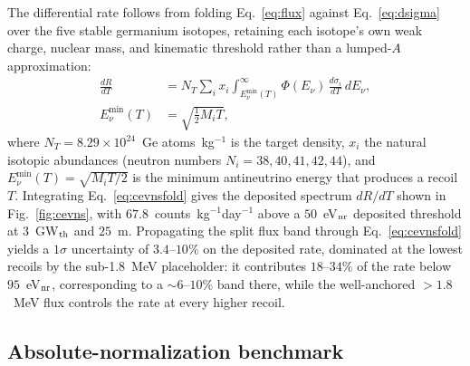 The differential rate follows from folding Eq.~\eqref{eq:flux} against Eq.~\eqref{eq:dsigma} over the five stable germanium isotopes, retaining each isotope's own weak charge, nuclear mass, and kinematic threshold rather than a lumped-$A$ approximation:
\begin{equation}
\begin{aligned}
\frac{dR}{dT} &= N_T \sum_i x_i \int_{E_\nu^{\min}(T)}^{\infty} \Phi(E_\nu)\, \frac{d\sigma_i}{dT}\, dE_\nu,\\
E_\nu^{\min}(T) &= \sqrt{\tfrac{1}{2}M_i T},
\end{aligned}
\label{eq:cevnsfold}
\end{equation}
where $N_T=8.29\times10^{24}$~Ge atoms~kg$^{-1}$ is the target density, $x_i$ the natural isotopic abundances (neutron numbers $N_i=38,40,41,42,44$), and $E_\nu^{\min}(T)=\sqrt{M_iT/2}$ is the minimum antineutrino energy that produces a recoil $T$. Integrating Eq.~\eqref{eq:cevnsfold} gives the deposited spectrum $dR/dT$ shown in Fig.~\ref{fig:cevns}, with $67.8$~counts~kg$^{-1}$day$^{-1}$ above a $50$~eV$_{\rm nr}$ deposited threshold at $3$~GW$_{\rm th}$ and $25$~m. Propagating the split flux band through Eq.~\eqref{eq:cevnsfold} yields a $1\sigma$ uncertainty of $3.4$--$10\%$ on the deposited rate, dominated at the lowest recoils by the sub-1.8~MeV placeholder: it contributes $18$--$34\%$ of the rate below $95$~eV$_{\rm nr}$, corresponding to a $\sim6$--$10\%$ band there, while the well-anchored $>1.8$~MeV flux controls the rate at every higher recoil.

\subsection{Absolute-normalization benchmark}

